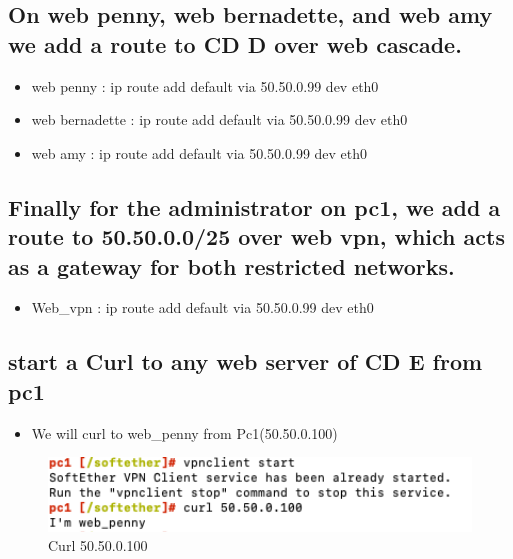 \subsection{On web penny, web bernadette, and web amy we add a route to CD D
over web cascade.}
\begin{itemize}
    \item web penny : ip route add default via 50.50.0.99 dev eth0
\end{itemize}
\begin{itemize}
    \item web bernadette : ip route add default via 50.50.0.99 dev eth0
\end{itemize}
 \begin{itemize}
    \item web amy  : ip route add default via 50.50.0.99 dev eth0
\end{itemize}
\subsection{Finally for the administrator on pc1, we add a route to 50.50.0.0/25 over web vpn, which acts as a gateway for both restricted networks.}
 \begin{itemize}
    \item Web\_vpn : ip route add default via  50.50.0.99 dev eth0
\end{itemize}
\subsection{start a Curl to any web server of CD E from pc1 }
\begin{itemize}
    \item We will curl to web\_penny from Pc1(50.50.0.100)
\end{itemize}
\begin{figure}[H]
\centering
  \includegraphics[width=1\textwidth]{Images/pc1 curl web penny.png}
  \caption{Curl 50.50.0.100}
  \label{fig }
\end{figure}
